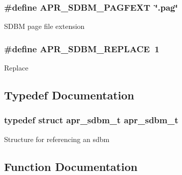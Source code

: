 \subsubsection[{\texorpdfstring{A\+P\+R\+\_\+\+S\+D\+B\+M\+\_\+\+P\+A\+G\+F\+E\+XT}{APR_SDBM_PAGFEXT}}]{\setlength{\rightskip}{0pt plus 5cm}\#define A\+P\+R\+\_\+\+S\+D\+B\+M\+\_\+\+P\+A\+G\+F\+E\+XT~\char`\"{}.pag\char`\"{}}\hypertarget{group__APR__Util__DBM__SDBM_gaa03fa1d1183240ca0845c54cc07df557}{}\label{group__APR__Util__DBM__SDBM_gaa03fa1d1183240ca0845c54cc07df557}
S\+D\+BM page file extension 
\subsubsection[{\texorpdfstring{A\+P\+R\+\_\+\+S\+D\+B\+M\+\_\+\+R\+E\+P\+L\+A\+CE}{APR_SDBM_REPLACE}}]{\setlength{\rightskip}{0pt plus 5cm}\#define A\+P\+R\+\_\+\+S\+D\+B\+M\+\_\+\+R\+E\+P\+L\+A\+CE~1}\hypertarget{group__APR__Util__DBM__SDBM_ga84e2252c9ddf5e6c64ed1be43d2d0e53}{}\label{group__APR__Util__DBM__SDBM_ga84e2252c9ddf5e6c64ed1be43d2d0e53}
Replace 

\subsection{Typedef Documentation}
\subsubsection[{\texorpdfstring{apr\+\_\+sdbm\+\_\+t}{apr_sdbm_t}}]{\setlength{\rightskip}{0pt plus 5cm}typedef struct {\bf apr\+\_\+sdbm\+\_\+t} {\bf apr\+\_\+sdbm\+\_\+t}}\hypertarget{group__APR__Util__DBM__SDBM_gaf24cdea6e4884036a40484259efa68c6}{}\label{group__APR__Util__DBM__SDBM_gaf24cdea6e4884036a40484259efa68c6}
Structure for referencing an sdbm 

\subsection{Function Documentation}
